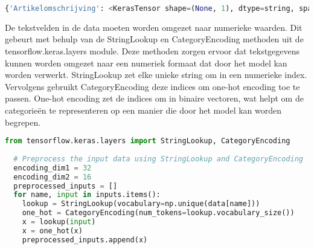 \begin{lstlisting}[language=Python, caption={Uitkomst van de dictionary}]
  {'Artikelomschrijving': <KerasTensor shape=(None, 1), dtype=string, sparse=None, name=Artikelomschrijving>, 'Artikelomschrijving.1': <KerasTensor shape=(None, 1), dtype=string, sparse=None, name=Artikelomschrijving.1>, 'Voorts.gem.prijs': <KerasTensor shape=(None, 1), dtype=string, sparse=None, name=Voorts.gem.prijs>}
\end{lstlisting}

De tekstvelden in de data moeten worden omgezet naar numerieke waarden. Dit gebeurt met behulp van de StringLookup en CategoryEncoding methoden uit de tensorflow.keras.layers module. Deze methoden zorgen ervoor dat tekstgegevens kunnen worden omgezet naar een numeriek formaat dat door het model kan worden verwerkt. StringLookup zet elke unieke string om in een numerieke index. Vervolgens gebruikt CategoryEncoding deze indices om one-hot encoding toe te passen. One-hot encoding zet de indices om in binaire vectoren, wat helpt om de categorieën te representeren op een manier die door het model kan worden begrepen.
\begin{lstlisting}[language=Python, caption={Omzetten van tekstvelden naar numerieke waarden}]
  from tensorflow.keras.layers import StringLookup, CategoryEncoding
  
  # Preprocess the input data using StringLookup and CategoryEncoding
  encoding_dim1 = 32
  encoding_dim2 = 16
  preprocessed_inputs = []
  for name, input in inputs.items():
    lookup = StringLookup(vocabulary=np.unique(data[name]))
    one_hot = CategoryEncoding(num_tokens=lookup.vocabulary_size())
    x = lookup(input)
    x = one_hot(x)
    preprocessed_inputs.append(x)
\end{lstlisting}


\section{}%
\label{sec:AutoencoderModelPOC}

